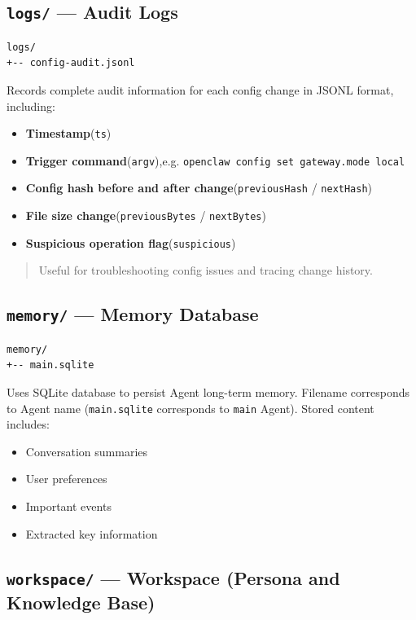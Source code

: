 \subsection{\texttt{logs/} --- Audit Logs}


\begin{lstlisting}
logs/
+-- config-audit.jsonl
\end{lstlisting}

Records complete audit information for each config change in JSONL format, including:

\begin{itemize}
  \item \textbf{Timestamp}(\texttt{ts})
  \item \textbf{Trigger command}(\texttt{argv}),e.g. \texttt{openclaw config set gateway.mode local}
  \item \textbf{Config hash before and after change}(\texttt{previousHash} / \texttt{nextHash})
  \item \textbf{File size change}(\texttt{previousBytes} / \texttt{nextBytes})
  \item \textbf{Suspicious operation flag}(\texttt{suspicious})
\end{itemize}

\begin{quote}
Useful for troubleshooting config issues and tracing change history.
\end{quote}

\subsection{\texttt{memory/} --- Memory Database}


\begin{lstlisting}
memory/
+-- main.sqlite
\end{lstlisting}

Uses SQLite database to persist Agent long-term memory. Filename corresponds to Agent name (\texttt{main.sqlite} corresponds to \texttt{main} Agent). Stored content includes:

\begin{itemize}
  \item Conversation summaries
  \item User preferences
  \item Important events
  \item Extracted key information
\end{itemize}

\subsection{\texttt{workspace/} --- Workspace (Persona and Knowledge Base)}



